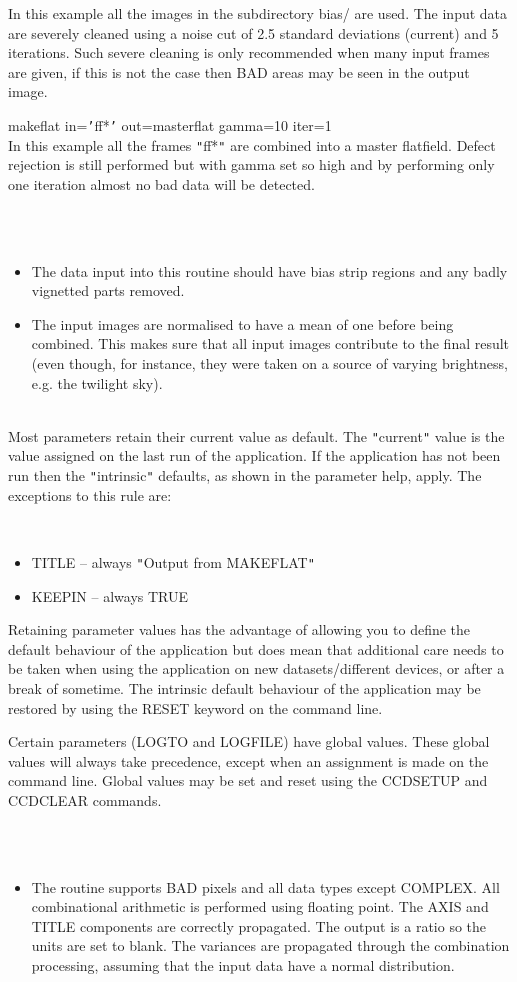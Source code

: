 \documentclass[twoside,11pt]{article}
\newcommand{\htmlref}[2]{#1}
\renewcommand{\_}{\texttt{\symbol{95}}}
\newcommand{\qt}[1]{{\tt "}#1{\tt "}}
\newcommand{\qs}[1]{{\tt '}#1{\tt '}}
\newcommand{\xroutine}[1]{\htmlref{{\sc #1}}{#1}}
\newcommand{\sstexamplesubsection}[2]{\sloppy \item{\ssttt #1} \mbox{} \\ #2 }
\newcommand{\sstnotes}[1]{\item[Notes:] \mbox{} \\[1.3ex] #1}
\newcommand{\sstdiytopic}[2]{\item[#1:] \mbox{} \\[1.3ex] #2}
\newcommand{\sstimplementationstatus}[1]{
   \item[{Implementation Status:}] \mbox{} \\[1.3ex] #1}
\newcommand{\sstitemlist}[1]{
  \mbox{} \\
  \vspace{-3.5ex}
  \begin{itemize}
     #1
  \end{itemize}
}
\newcommand{\sstitem}{\item}
\newcommand{\sstexamplesubsection}[2]{\item[{\ssttt #1}] #2}
\newcommand{\sstnotes}[1]{\item[Notes:] #1 }
\newcommand{\sstdiytopic}[2]{\item[{#1}] #2 }
\newcommand{\sstimplementationstatus}[1]{
      \item[Implementation Status:] #1
   }
\newcommand{\sstitemlist}[1]{
      \begin{itemize}
         #1
      \end{itemize}
      \\
   }
\newcommand{\sstitem}{\item}
\begin{document}
{{{      } {
         In this example all the images in the subdirectory bias/ are
         used. The input data are severely cleaned using a noise cut
         of 2.5 standard deviations (current) and 5 iterations. Such
         severe cleaning is only recommended when many input frames
         are given, if this is not the case then BAD areas may be seen
         in the output image.
      }
      \sstexamplesubsection{
        makeflat in=\qs{ff*} out=master\_flat gamma=10 iter=1
      } {
        In this example all the frames \qt{ff*} are combined into a master
        flatfield. Defect rejection is still performed but with
        gamma set so high and by performing only one iteration
        almost no bad data will be detected.
      }



   }
   \sstnotes{
      \sstitemlist{

         \sstitem
         The data input into this routine should have bias strip
         regions and any badly vignetted parts removed.

         \sstitem 
         The input images are normalised to have a mean of one
         before being combined. This makes sure that all input images
         contribute to the final result (even though, for instance,
         they were taken on a source of varying brightness, e.g. the 
         twilight sky).
      }
   }
   \sstdiytopic{
      Behaviour of parameters
   } {
      Most parameters retain their current value as default. The
      \qt{current} value is the value assigned on the last run of the
      application. If the application has not been run then the
      \qt{intrinsic} defaults, as shown in the parameter help, apply.
      The exceptions to this rule are:
      \sstitemlist{

         \sstitem
            TITLE   -- always \qt{Output from MAKEFLAT}

         \sstitem
            KEEPIN  -- always TRUE

      }
      Retaining parameter values has the advantage of allowing you to
      define the default behaviour of the application but does mean
      that additional care needs to be taken when using the application
      on new datasets/different devices, or after a break of sometime.
      The intrinsic default behaviour of the application may be
      restored by using the RESET keyword on the command line.

      Certain parameters (LOGTO and LOGFILE) have global values. These
      global values will always take precedence, except when an
      assignment is made on the command line.  Global values may be set
      and reset using the \xroutine{CCDSETUP} and \xroutine{CCDCLEAR} commands.
   }
   \sstimplementationstatus{
      \sstitemlist{

         \sstitem
         The routine supports BAD pixels and all data types except
           COMPLEX.  All combinational arithmetic is performed using
           floating point.  The AXIS and TITLE components are
           correctly propagated. The output is a ratio so the units are set
           to blank. The variances are propagated through the combination
           processing, assuming that the input data have a normal
           distribution.
      }
   }
}
\end{document}
